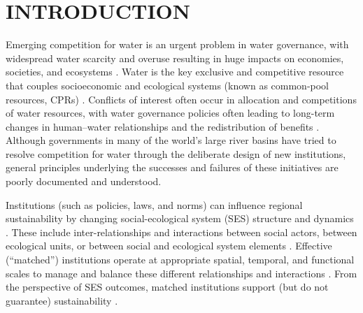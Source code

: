\documentclass{nsr}
\begin{document}
\section{INTRODUCTION}\label{intro}
Emerging competition for water is an urgent problem in water governance, with widespread water scarcity and overuse resulting in huge impacts on economies, societies, and ecosystems \cite{gleickPeakwaterlimits2010,dolanEvaluatingeconomicimpact2021,siwiCompetitionWaterGetting,ziolkowskaCompetitionWaterResources2016,distefanoArewedeep2017}.
Water is the key exclusive and competitive resource that couples socioeconomic and ecological systems (known as common-pool resources, CPRs) \cite{wutichWaterScarcitySustainability2009,ostromGeneralFrameworkAnalyzing2009,castilla-rhoSocialtippingpoints2017,castilla-rhoGroundwaterCommonPool2020}.
Conflicts of interest often occur in allocation and competitions of water resources, with water governance policies often leading to long-term changes in human–water relationships and the redistribution of benefits \cite{wangAlignmentsocialecological2019,speedBasinwaterallocation2013,chingManagingsocioecologyvery2015}.
Although governments in many of the world’s large river basins have tried to resolve competition for water through the deliberate design of new institutions, general principles underlying the successes and failures of these initiatives are poorly documented and understood.

Institutions (such as policies, laws, and norms) can influence regional sustainability by changing social-ecological system (SES) structure and dynamics \cite{youngInstitutionsenvironmentalchange2008,cummingAdvancingunderstandingnatural2020,lieninstitutionalgrammartool2020}.
These include inter-relationships and interactions between social actors, between ecological units, or between social and ecological system elements \cite{bodinCollaborativeenvironmentalgovernance2017,barnesSocialecologicalalignmentecological2019}.
Effective (“matched”) institutions operate at appropriate spatial, temporal, and functional scales to manage and balance these different relationships and interactions \cite{heWateringEnvironmentalRegulation2020,kellenbergempiricalinvestigationpollution2009}.
From the perspective of SES outcomes, matched institutions support (but do not guarantee) sustainability \cite{epsteinInstitutionalfitsustainability2015,wangAlignmentsocialecological2019}.
\end{document}
